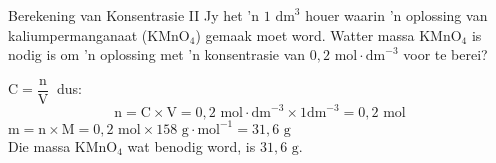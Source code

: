     \noindent
\par


      \begin{wex}{Berekening van Konsentrasie II }
{
Jy het 'n $1 {\text{ dm}}^{3}$ houer waarin 'n oplossing van kaliumpermanganaat ($\text{KMnO}{}_{4}$) gemaak moet word. Watter massa $\text{KMnO}{}_{4}$ is nodig is om 'n oplossing met 'n konsentrasie van $0,2 \text{ mol}\cdot \text{dm}^{-3}$ voor te berei? 
     }
{
$\text{C}=\dfrac{\text{n}}{\text{V}}~$ dus:
      \label{m38712*id283321}\nopagebreak\noindent{}        
    \begin{equation*}
    \text{n}=\text{C}\ensuremath{\times}\text{V}=0,2 \text{ mol} \cdot \text{dm}^{-3} \times 1 \text{dm}^{-3} = 0,2 \text{ mol}
      \end{equation*}
$\text{m}=\text{n} \times \text{M} = 0,2 \text{ mol} \times 158 \text{ g} \cdot \text{mol}^{-1} = 31,6 \text{ g}$\\
Die massa $\text{KMnO}{}_{4}$ wat benodig word, is $31,6 \text{ g}$.
 
}
    \end{wex}
    \noindent
\label{m38712*secfhsst!!!underscore!!!id1795} 

